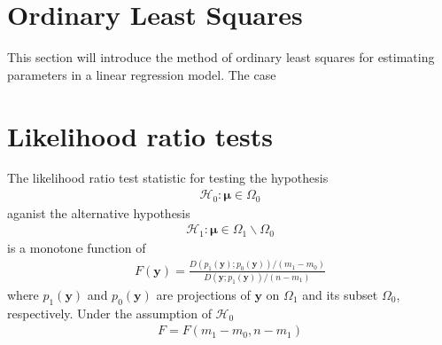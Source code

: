 \section{Ordinary Least Squares}
This section will introduce the method of ordinary least squares for estimating parameters in a linear regression model.
The case 

\section{Likelihood ratio tests}

\begin{theorem}
The likelihood ratio test statistic for testing the hypothesis
\begin{align}
\mathcal{H}_0:\boldsymbol{\mu} \in \Omega_0
\end{align}
aganist the alternative hypothesis
\begin{align}
\mathcal{H}_1:\boldsymbol{\mu} \in \Omega_1 \backslash \Omega_0
\end{align}
is a monotone function of 
\begin{align}
F(\boldsymbol{y})=\frac{D(p_1(\boldsymbol{y});p_0(\boldsymbol{y}))/(m_1-m_0)}{D(\boldsymbol{y};p_1(\boldsymbol{y}))/(n-m_1)}
\end{align}
where $p_1(\boldsymbol{y})$ and $p_0(\boldsymbol{y})$ are projections of $\boldsymbol{y}$ on $\Omega_1$ and its subset $\Omega_0$, respectively.
Under the assumption of $\mathcal{H}_0$ 
\begin{align}
F = F(m_1-m_0,n-m_1)
\end{align}
\end{theorem}